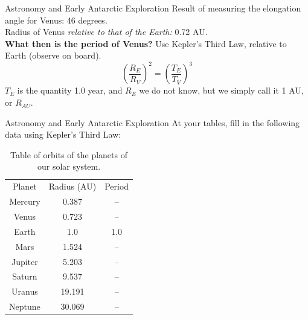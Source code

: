 \documentclass{beamer}
\begin{document}
\begin{frame}{Astronomy and Early Antarctic Exploration}
Result of measuring the elongation angle for Venus: 46 degrees. \\ \vspace{1cm}
Radius of Venus \textit{relative to that of the Earth:} 0.72 AU. \\ \vspace{1cm}
\textbf{What then is the period of Venus?} Use Kepler's Third Law, relative to Earth (observe on board).
\begin{equation}
\left(\frac{R_{E}}{R_{V}}\right)^2 = \left(\frac{T_{E}}{T_{V}}\right)^3
\end{equation}
$T_E$ is the quantity 1.0 year, and $R_E$ we do not know, but we simply call it 1 AU, or $R_{AU}$.
\end{frame}

\begin{frame}{Astronomy and Early Antarctic Exploration}
At your tables, fill in the following data using Kepler's Third Law:
\begin{table}
\centering
\begin{tabular}{| c | c | c |}
\hline \hline
Planet & Radius (AU) & Period \\
Mercury & 0.387 & -- \\ 
Venus & 0.723 & -- \\ 
Earth & 1.0 & 1.0 \\ 
Mars & 1.524 & -- \\ 
Jupiter & 5.203 & -- \\ 
Saturn & 9.537 & -- \\ 
Uranus & 19.191 & -- \\ 
Neptune & 30.069 & -- \\ 
\hline
\hline
\end{tabular}
\caption{\label{tab:kep} Table of orbits of the planets of our solar system.}
\end{table}
\end{frame}
\end{document}
